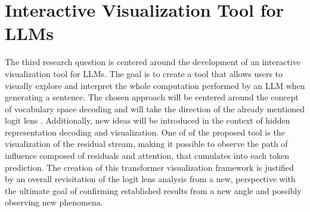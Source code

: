 \section{Interactive Visualization Tool for LLMs}

The third research question is centered around the development of an interactive visualization tool for LLMs.
The goal is to create a tool that allows users to visually explore and interpret the whole computation performed by an LLM when generating a sentence.
The chosen approach will be centered around the concept of vocabulary space decoding and will take the direction of the already mentioned logit lens .
Additionally, new ideas will be introduced in the context of hidden representation decoding and visualization.
One of  of the proposed tool is the visualization of the residual stream, making it possible to observe the path of influence composed of residuals and attention, that cumulates into each token prediction.
The creation of this transformer visualization framework is justified by an overall revisitation of the logit lens analysis from a new,  perspective with the ultimate goal of confirming established results from a new angle and possibly observing new phenomena. 
